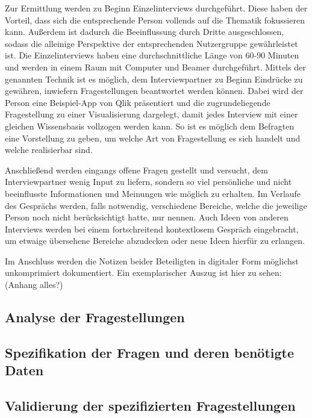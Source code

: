 Zur Ermittlung werden zu Beginn Einzelinterviews durchgeführt. 
Diese haben der Vorteil, dass sich die entsprechende Person vollends auf die Thematik fokussieren kann.
Außerdem ist dadurch die Beeinflussung durch Dritte ausgeschlossen, sodass die alleinige Perspektive der entsprechenden Nutzergruppe gewährleistet ist.
Die Einzelinterviews haben eine durchschnittliche Länge von 60-90 Minuten und werden in einem Raum mit Computer und Beamer durchgeführt.
Mittels der genannten Technik ist es möglich, dem Interviewpartner zu Beginn Eindrücke zu gewähren, inwiefern Fragestellungen beantwortet werden können.
Dabei wird der Person eine Beispiel-App von Qlik präsentiert und die zugrundeliegende Fragestellung zu einer Visualisierung dargelegt, damit jedes Interview mit einer gleichen Wissensbasis vollzogen werden kann.
So ist es möglich dem Befragten eine Vorstellung zu geben, um welche Art von Fragestellung es sich handelt und welche realisierbar sind.

Anschließend werden eingangs offene Fragen gestellt und versucht, dem Interviewpartner wenig Input zu liefern, sondern so viel persönliche und nicht beeinflusste Informationen und Meinungen wie möglich zu erhalten.
Im Verlaufe des Gesprächs werden, falls notwendig, verschiedene Bereiche, welche die jeweilige Person noch nicht berücksichtigt hatte, nur nennen.
Auch Ideen von anderen Interviews werden bei einem fortschreitend kontextlosem Gespräch eingebracht, um etwaige übersehene Bereiche abzudecken oder neue Ideen hierfür zu erlangen. 

Im Anschluss werden die Notizen beider Beteiligten in digitaler Form möglichst unkomprimiert dokumentiert.
Ein exemplarischer Auszug ist hier zu sehen: 
(Anhang alles?)


\subsection{Analyse der Fragestellungen}
\subsection{Spezifikation der Fragen und deren benötigte Daten}
\subsection{Validierung der spezifizierten Fragestellungen}
